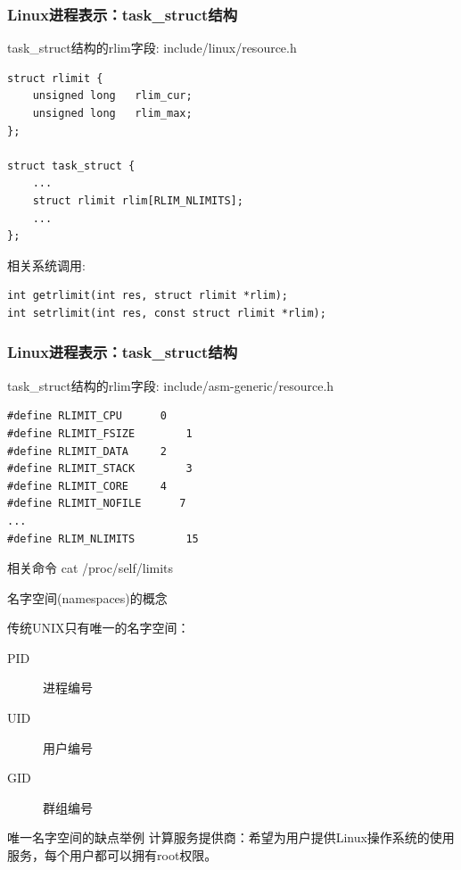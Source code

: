 \documentclass[xcolor=svgnames]{beamer}
\begin{document}
\begin{CJK*}{UTF8}{gbsn}
\begin{frame}[fragile]
\frametitle{Linux进程表示：task\_struct结构}
\begin{block}{task\_struct结构的rlim字段: include/linux/resource.h}
\begin{verbatim}
struct rlimit {
    unsigned long   rlim_cur;
    unsigned long   rlim_max;
};

struct task_struct {
    ...
    struct rlimit rlim[RLIM_NLIMITS];
    ...
};
\end{verbatim}
\end{block}
\begin{block}{相关系统调用:}
\begin{verbatim}
int getrlimit(int res, struct rlimit *rlim);
int setrlimit(int res, const struct rlimit *rlim);
\end{verbatim}
\end{block}
\end{frame}

\begin{frame}[fragile]
\frametitle{Linux进程表示：task\_struct结构}
\begin{block}{task\_struct结构的rlim字段: include/asm-generic/resource.h}
\begin{verbatim}
#define RLIMIT_CPU      0   
#define RLIMIT_FSIZE        1  
#define RLIMIT_DATA     2   
#define RLIMIT_STACK        3 
#define RLIMIT_CORE     4   
#define RLIMIT_NOFILE      7  
...
#define RLIM_NLIMITS        15
\end{verbatim}
\end{block}
\begin{block}{相关命令}
cat /proc/self/limits
\end{block}
\end{frame}

\begin{frame}{名字空间(namespaces)的概念}

传统UNIX只有唯一的名字空间：

\begin{description}
\item[PID] 进程编号
\item[UID] 用户编号
\item[GID] 群组编号
\end{description}

\begin{block}{唯一名字空间的缺点举例}
计算服务提供商：希望为用户提供Linux操作系统的使用服务，每个用户都可以拥有root权限。
\end{block}


\end{frame}
\end{CJK*}
\end{document}
